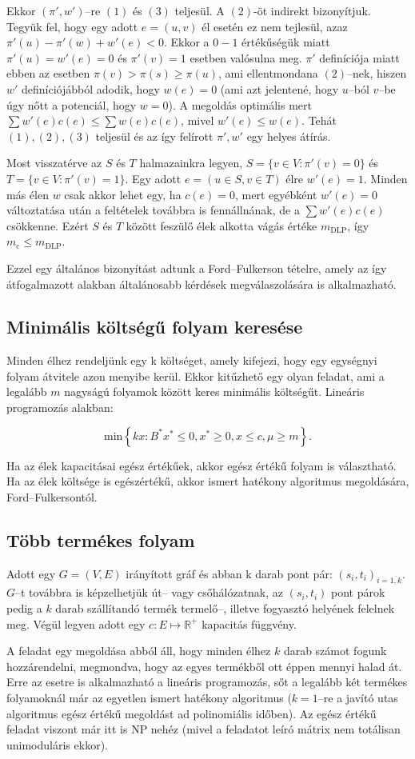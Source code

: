 Ekkor $(\pi',w')$--re $(1)$ és $(3)$ teljesül. A $(2)$-öt indirekt bizonyítjuk.
Tegyük fel, hogy egy adott $e=(u,v)$ él esetén ez nem tejlesül, azaz
$\pi'(u)-\pi'(w)+w'(e)<0$. Ekkor a $0-1$ értékűségük miatt $\pi'(u)=w'(e)=0$ és
$\pi'(v)=1$ esetben valósulna meg. $\pi'$ definíciója miatt ebben az esetben
$\pi(v) > \pi(s) \geq \pi(u)$, ami ellentmondana $(2)$--nek, hiszen $w'$
definíciójábból adodik, hogy $w(e)=0$ (ami azt jelentené, hogy $u$--ból $v$--be
úgy nőtt a potenciál, hogy $w=0$). A megoldás optimális mert $\sum w'(e)c(e)
	\leq \sum w(e)c(e)$, mivel $w'(e) \leq w(e)$. Tehát $(1), (2), (3)$ teljesül és az így
felírott $\pi', w'$ egy helyes átírás.

Most visszatérve az $S$ és $T$ halmazainkra legyen, $S=\{v \in V: \pi'(v)=0\} $
és $T=\{v \in V: \pi'(v)=1\}$. Egy adott $e=(u \in S, v \in T)$ élre $w'(e)=1$.
Minden más élen $w$ csak akkor lehet egy, ha $c(e)=0$, mert egyébként $w'(e)=0$
változtatása után a feltételek továbbra is fennállnának, de a $\sum w'(e)c(e)$
csökkenne. Ezért $S$ és $T$ között feszülő élek alkotta vágás értéke
$m_{\mbox{DLP}}$, így $m_{\mbox{c}} \leq m_{\mbox{DLP}}$.

Ezzel egy általános bizonyítást adtunk a Ford--Fulkerson tételre, amely az így
átfogalmazott alakban általánosabb kérdések megválaszolására is alkalmazható.

\subsection{Minimális költségű folyam keresése}

Minden élhez rendeljünk egy k költséget, amely kifejezi, hogy egy egységnyi folyam
átvitele azon menyibe kerül. Ekkor kitűzhető egy olyan feladat, ami a legalább
$m$ nagyságú folyamok között keres minimális költségűt. Lineáris programozás alakban:

\[ \mbox{min} \left\{kx: B^*x^* \leq 0, x^* \geq 0, x \leq c,\mu \geq m \right\}. \]

Ha az élek kapacitásai egész értékűek, akkor egész értékű folyam is választható.
Ha az élek költsége is egészértékű, akkor ismert hatékony algoritmus megoldására,
Ford--Fulkersontól.

\subsection{Több termékes folyam}

Adott egy $G=(V,E)$ irányított gráf és abban k darab pont pár:
$(s_i,t_i)_{i = \overline{1,k}}$. $G$--t továbbra is képzelhetjük út-- vagy
csőhálózatnak, az $(s_i, t_i)$ pont párok pedig a $k$ darab szállítandó termék
termelő--, illetve fogyasztó helyének felelnek meg. Végül legyen adott egy $c:E
	\mapsto \mathbb{R}^+$ kapacitás függvény.

A feladat egy megoldása abból áll, hogy minden élhez $k$ darab számot fogunk
hozzárendelni, megmondva, hogy az egyes termékből ott éppen mennyi halad át.
Erre az esetre is alkalmazható a lineáris programozás, sőt a legalább két
termékes folyamoknál már az egyetlen ismert hatékony algoritmus ($k=1$--re a
javító utas algoritmus egész értékű megoldást ad polinomiális időben). Az egész
értékű feladat viszont már itt is NP nehéz (mivel a feladatot leíró mátrix nem
totálisan unimoduláris ekkor).
